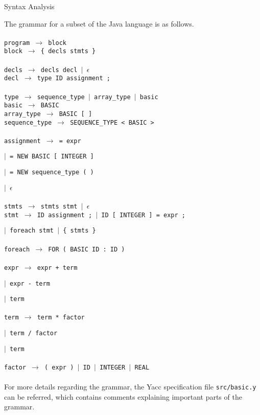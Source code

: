 \documentclass{article}
\begin{document}
\begin{subsection}{Syntax Analysis}

The grammar for a subset of the Java language is as follows.
\\ \\
\texttt{program $\rightarrow$ block}
\\
\texttt{block $\rightarrow$ \{ decls stmts \} }
\\ \\
\texttt{decls $\rightarrow$ decls decl $\vert$ $\epsilon$ }
\\
\texttt{decl $\rightarrow$ type ID assignment ;}
\\ \\
\texttt{type $\rightarrow$ sequence\_type $\vert$ array\_type $\vert$ basic}
\\
\texttt{basic $\rightarrow$ BASIC}
\\
\texttt{array\_type $\rightarrow$ BASIC [ ]}
\\
\texttt{sequence\_type $\rightarrow$ SEQUENCE\_TYPE < BASIC >}
\\ \\
\setlength{\parindent}{10ex}  \texttt{assignment $\rightarrow$ = expr}

\texttt{$\vert$ = NEW BASIC [ INTEGER ]}

\texttt{$\vert$ = NEW sequence\_type ( )}

\texttt{$\vert$ $\epsilon$}
\\ \\
\texttt{stmts $\rightarrow$ stmts stmt $\vert$ $\epsilon$ }
\\
\texttt{stmt $\rightarrow$ ID assignment ; $\vert$ ID [ INTEGER ] = expr ;}

\texttt{$\vert$ foreach stmt $\vert$ \{ stmts \}}
\\ \\
\texttt{foreach $\rightarrow$ FOR ( BASIC ID : ID ) }
\\ \\
\texttt{expr $\rightarrow$ expr + term}

\texttt{$\vert$ expr - term}

\texttt{$\vert$ term}
\\ \\
\texttt{term $\rightarrow$ term * factor}

\texttt{$\vert$ term / factor}

\texttt{$\vert$ term}
\\ \\
\texttt{factor $\rightarrow$ ( expr ) $\vert$ ID $\vert$ INTEGER $\vert$ REAL}
\\ \\
For more details regarding the grammar, the Yacc specification file \texttt{src/basic.y} can be referred, which contains comments explaining important parts of the grammar.

\end{subsection}
\end{document}
